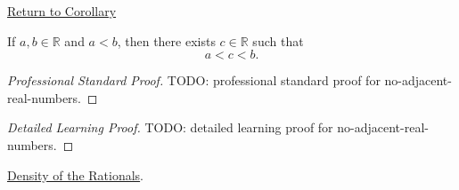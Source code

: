 \newpage
{}
\label{prf:no-adjacent-real-numbers}

\begin{remark*}[Return]
\hyperref[cor:no-adjacent-real-numbers]{Return to Corollary}
\end{remark*}

\begin{corollary*}
If $a,b\in\mathbb{R}$ and $a<b$, then there exists $c\in\mathbb{R}$ such that
\[
a<c<b.
\]
\end{corollary*}

\begin{proof}[Professional Standard Proof]
\LRAProofBodyStart
TODO: professional standard proof for no-adjacent-real-numbers.
\end{proof}

\begin{proof}[Detailed Learning Proof]
\LRAProofBodyStart
TODO: detailed learning proof for no-adjacent-real-numbers.
\end{proof}

\begin{remark*}
\end{remark*}

\begin{dependencies}
\hyperref[thm:density-of-rationals-in-reals]{Density of the Rationals}.
\end{dependencies}

\clearpage
